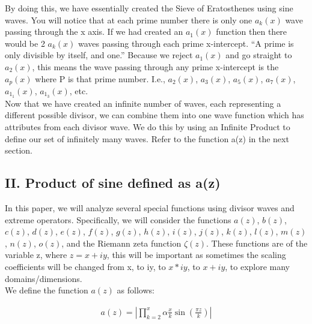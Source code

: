 \documentclass{article}
\begin{document}
By doing this, we have essentially created the Sieve of Eratosthenes using sine waves. You will notice that at each prime number there is only one $a_k(x)$ wave passing through the x axis. If we had created an $a_1(x)$ function then there would be 2 $a_k(x)$ waves passing through each prime x-intercept. “A prime is only divisible by itself, and one.” Because we reject $a_1(x)$ and go straight to $a_2(x)$, this means the wave passing through any prime x-intercept is the $a_p(x)$ where P is that prime number. I.e., $a_2(x)$, $a_3(x)$, $a_5(x)$, $a_7(x)$, $a_1_1(x)$, $a_1_3(x)$, etc. \\
\newline
Now that we have created an infinite number of waves, each representing a different possible divisor, we can combine them into one wave function which has attributes from each divisor wave. We do this by using an Infinite Product to define our set of infinitely many waves. Refer to the function a(z) in the next section.

\subsection*{II. Product of sine defined as a(z)}
In this paper, we will analyze several special functions using divisor waves and extreme operators. Specifically, we will consider the functions $a(z)$, $b(z)$, $c(z)$, $d(z)$, $e(z)$, $f(z)$, $g(z)$, $h(z)$, $i(z)$, $j(z)$, $k(z)$, $l(z)$, $m(z)$, $n(z)$, $o(z)$, and the Riemann zeta function $\zeta(z)$. These functions are of the variable z, where $z = x + iy$, this will be important as sometimes the scaling coefficients will be changed from x, to iy, to $x*iy$, to $x + iy$, to explore many domains/dimensions. \\

We define the function $a(z)$ as follows:

\begin{align*}
	a(z) = |\prod_{k=2}^x \alpha\frac{x}{k}\sin\left(\frac{\pi z}{k}\right)|
\end{align*}
\end{document}
